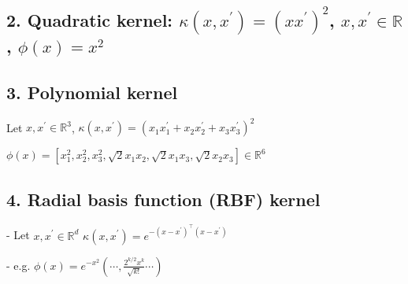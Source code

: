 
\subsection*{2. Quadratic kernel: $\kappa\left(x, x^{\prime}\right)=\left(x x^{\prime}\right)^{2}$, $x, x^{\prime} \in \mathbb{R}$, $\phi(x)=x^{2}$}


\subsection*{3. Polynomial kernel}
Let $x, x^{\prime} \in \mathbb{R}^{3}$,
$
\kappa\left(x, x^{\prime}\right)=\left(x_{1} x_{1}^{\prime}+x_{2} x_{2}^{\prime}+x_{3} x_{3}^{\prime}\right)^{2}
$

$
\phi(x)=\left[x_{1}^{2}, x_{2}^{2}, x_{3}^{2}, \sqrt{2} x_{1} x_{2}, \sqrt{2} x_{1} x_{3}, \sqrt{2} x_{2} x_{3}\right] \in \mathbb{R}^{6}
$


\subsection*{4. Radial basis function (RBF) kernel}
- Let $x, x^{\prime} \in \mathbb{R}^{d}$
$
\kappa\left(x, x^{\prime}\right)=e^{-\left(x-x^{\prime}\right)^{\top}\left(x-x^{\prime}\right)}
$

- e.g. 
$
\phi(x)=e^{-x^{2}}\left(\cdots, \frac{2^{k / 2} x^{k}}{\sqrt{k !}} \cdots\right)
$


